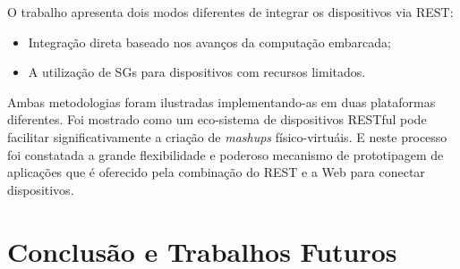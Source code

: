 \documentclass[12pt,a4paper,oneside]{report}
\begin{document}
O trabalho apresenta dois modos diferentes de integrar os dispositivos via REST:
\begin{itemize}
	\item Integração direta baseado nos avanços da computação embarcada;
	\item A utilização de SGs para dispositivos com recursos limitados.
\end{itemize}

Ambas metodologias foram ilustradas implementando-as em duas plataformas diferentes. Foi mostrado como um eco-sistema de dispositivos RESTful pode facilitar significativamente a criação de \emph{mashups} físico-virtuáis. E neste processo foi constatada a grande flexibilidade e poderoso mecanismo de prototipagem de aplicações que é oferecido pela combinação do REST e a Web para conectar dispositivos.


\chapter{Conclusão e Trabalhos Futuros}
\label{chap:conclusao}


\cleardoublepage
{}
\end{document}
